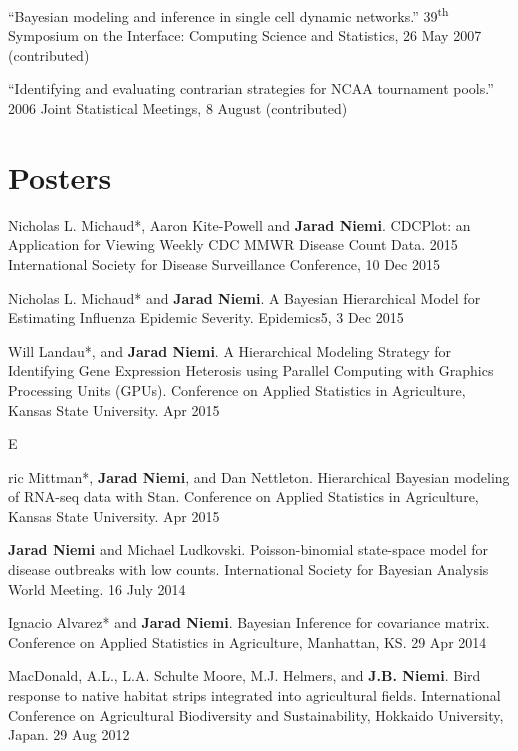 \documentclass[overlapped,line]{res}
\begin{document}
\begin{resume}
{``Bayesian modeling and inference in single cell dynamic networks.'' 39\textsuperscript{th} Symposium on the Interface: Computing Science and Statistics, 26 May 2007 (contributed)


``Identifying and evaluating contrarian strategies for NCAA tournament pools.'' 2006 Joint Statistical Meetings, 8 August (contributed)

}


\section{\bf Posters}

{\small

Nicholas L. Michaud*, Aaron Kite-Powell and {\bf Jarad Niemi}. CDCPlot: an Application for Viewing Weekly CDC MMWR Disease Count Data. 2015 International Society for Disease Surveillance Conference, 10 Dec 2015

Nicholas L. Michaud* and {\bf Jarad Niemi}. A Bayesian Hierarchical Model for Estimating Influenza Epidemic Severity. Epidemics5, 3 Dec 2015

Will Landau*, and {\bf Jarad Niemi}. A Hierarchical Modeling Strategy for Identifying Gene Expression Heterosis using Parallel Computing with Graphics Processing Units (GPUs). Conference on Applied Statistics in Agriculture, Kansas State University. Apr 2015

\newpage\opening 

Eric Mittman*, {\bf Jarad Niemi}, and Dan Nettleton. Hierarchical Bayesian modeling of RNA-seq data with Stan. Conference on Applied Statistics in Agriculture, Kansas State University. Apr 2015

{\bf Jarad Niemi} and Michael Ludkovski. Poisson-binomial state-space model for disease outbreaks with low counts. International Society for Bayesian Analysis World Meeting. 16 July 2014 

Ignacio Alvarez* and {\bf Jarad Niemi}. Bayesian Inference for covariance matrix. Conference on Applied Statistics in Agriculture, Manhattan, KS. 29 Apr 2014 


MacDonald, A.L., L.A. Schulte Moore, M.J. Helmers, and {\bf J.B. Niemi}.  Bird response to native habitat strips integrated into agricultural fields.  International Conference on Agricultural Biodiversity and Sustainability, Hokkaido University, Japan.  29 Aug 2012 



}
\end{resume}
\end{document}
